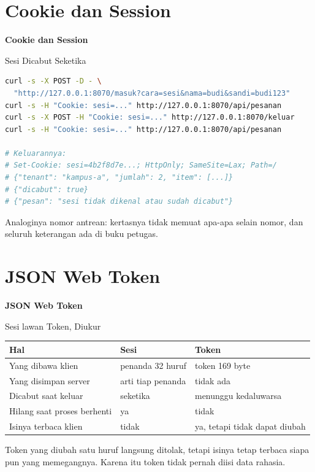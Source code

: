 \documentclass[aspectratio=169, table, 12pt]{beamer}
\begin{document}
\section{Cookie dan Session}

\begin{frame}{\hfill}
  \centering
  \Huge{\textbf{Cookie dan Session}}
\end{frame}

\begin{frame}[fragile]{{\Large Sesi Dicabut Seketika}}
  \vspace{2pt}
\begin{lstlisting}[language=bash]
curl -s -X POST -D - \
  "http://127.0.0.1:8070/masuk?cara=sesi&nama=budi&sandi=budi123"
curl -s -H "Cookie: sesi=..." http://127.0.0.1:8070/api/pesanan
curl -s -X POST -H "Cookie: sesi=..." http://127.0.0.1:8070/keluar
curl -s -H "Cookie: sesi=..." http://127.0.0.1:8070/api/pesanan

# Keluarannya:
# Set-Cookie: sesi=4b2f8d7e...; HttpOnly; SameSite=Lax; Path=/
# {"tenant": "kampus-a", "jumlah": 2, "item": [...]}
# {"dicabut": true}
# {"pesan": "sesi tidak dikenal atau sudah dicabut"}
\end{lstlisting}
  \vspace{2pt}
  {\small Analoginya nomor antrean: kertasnya tidak memuat apa-apa selain
  nomor, dan seluruh keterangan ada di buku petugas.}
\end{frame}

\section{JSON Web Token}

\begin{frame}{\hfill}
  \centering
  \Huge{\textbf{JSON Web Token}}
\end{frame}

\begin{frame}{{\Large Sesi lawan Token, Diukur}}
  \vspace{6pt}
  \centering
  {\footnotesize
  \begin{tabularx}{\textwidth}{Yll}
    \hline
    \textbf{Hal} & \textbf{Sesi} & \textbf{Token} \\
    \hline
    Yang dibawa klien & penanda 32 huruf & token 169 byte \\
    \hline
    Yang disimpan server & arti tiap penanda & tidak ada \\
    \hline
    Dicabut saat keluar & seketika & menunggu kedaluwarsa \\
    \hline
    Hilang saat proses berhenti & ya & tidak \\
    \hline
    Isinya terbaca klien & tidak & ya, tetapi tidak dapat diubah \\
    \hline
  \end{tabularx}}

  \vspace{8pt}
  {\small Token yang diubah satu huruf langsung ditolak, tetapi isinya tetap
  terbaca siapa pun yang memegangnya. Karena itu token tidak pernah diisi
  data rahasia.}
\end{frame}
\end{document}
